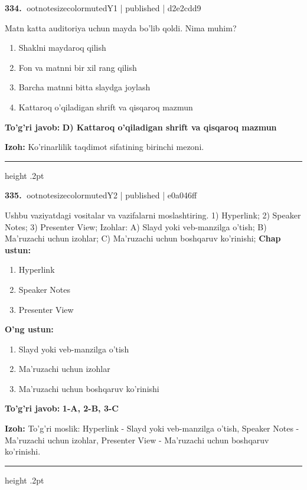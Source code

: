 \documentclass[10pt,a4paper]{article}
\begin{document}
\textbf{\color{ink}334.} {ootnotesizecolor{muted}Y1 | published | d2e2cdd9}
\par
Matn katta auditoriya uchun mayda bo'lib qoldi. Nima muhim?
\begin{enumerate}[label=\Alph*),leftmargin=9mm]
\item Shaklni maydaroq qilish
\item Fon va matnni bir xil rang qilish
\item Barcha matnni bitta slaydga joylash
\item Kattaroq o'qiladigan shrift va qisqaroq mazmun
\end{enumerate}
\begin{tcolorbox}[enhanced,breakable,colback=teal!4,colframe=teal!55!black,boxrule=0.45pt,arc=1.2mm,left=2.8mm,right=2.8mm,top=2mm,bottom=2mm]
\textbf{\color{teal}To'g'ri javob:} \textbf{D) Kattaroq o'qiladigan shrift va qisqaroq mazmun}
\par\smallskip
\textbf{Izoh:} Ko'rinarlilik taqdimot sifatining birinchi mezoni.
\end{tcolorbox}
\vspace{2mm}\hrule height .2pt\vspace{2mm}

\textbf{\color{ink}335.} {ootnotesizecolor{muted}Y2 | published | e0a046ff}
\par
Ushbu vaziyatdagi vositalar va vazifalarni moslashtiring.  1) Hyperlink;  2) Speaker Notes;  3) Presenter View;  Izohlar: A) Slayd yoki veb-manzilga o'tish;  B) Ma'ruzachi uchun izohlar;  C) Ma'ruzachi uchun boshqaruv ko'rinishi;
\textbf{Chap ustun:}\begin{enumerate}[label=\arabic*),leftmargin=9mm]
\item Hyperlink
\item Speaker Notes
\item Presenter View
\end{enumerate}
\textbf{O'ng ustun:}\begin{enumerate}[label=\Alph*),leftmargin=9mm]
\item Slayd yoki veb-manzilga o'tish
\item Ma'ruzachi uchun izohlar
\item Ma'ruzachi uchun boshqaruv ko'rinishi
\end{enumerate}
\begin{tcolorbox}[enhanced,breakable,colback=teal!4,colframe=teal!55!black,boxrule=0.45pt,arc=1.2mm,left=2.8mm,right=2.8mm,top=2mm,bottom=2mm]
\textbf{\color{teal}To'g'ri javob:} \textbf{1-A, 2-B, 3-C}
\par\smallskip
\textbf{Izoh:} To'g'ri moslik: Hyperlink - Slayd yoki veb-manzilga o'tish, Speaker Notes - Ma'ruzachi uchun izohlar, Presenter View - Ma'ruzachi uchun boshqaruv ko'rinishi.
\end{tcolorbox}
\vspace{2mm}\hrule height .2pt\vspace{2mm}
\end{document}
